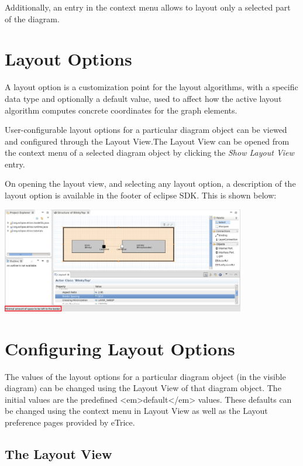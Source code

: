 Additionally, an entry in the context menu allows to layout only a selected part of the diagram.

\section{\label{layoutOptions}Layout Options}

A layout option is a customization point for the layout algorithms, with a specific data type and 
optionally a default value, used to affect how the active layout algorithm computes concrete coordinates 
for the graph elements.

User-configurable layout options for a particular diagram object can be viewed and configured through the 
Layout View.The Layout View can be opened from the context menu of a selected diagram object by clicking 
the \textit{Show Layout View} entry. 

On opening the layout view, and selecting any layout option, a description of the layout option is 
available in the footer of eclipse SDK. This is shown below:

\includegraphics[width=0.8\textwidth]{images/043-LayoutOptionDescription.png}

\section{\label{configureOptions}Configuring Layout Options}

The values of the layout options for a particular diagram object (in the visible diagram) can be changed 
using the Layout View of that diagram object. The initial values are the predefined <em>default</em> values. 
These defaults can be changed using the context menu in Layout View as well as the Layout preference pages 
provided by eTrice.

\subsection{\label{layoutView}The Layout View}


